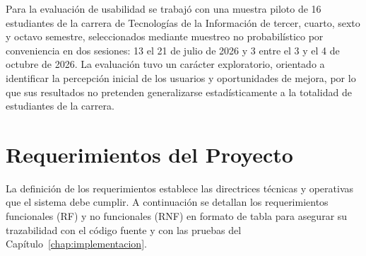 Para la evaluación de usabilidad se trabajó con una muestra piloto de 16 estudiantes de la carrera de Tecnologías de la Información de tercer, cuarto, sexto y octavo semestre, seleccionados mediante muestreo no probabilístico por conveniencia en dos sesiones: 13 el 21 de julio de 2026 y 3 entre el 3 y el 4 de octubre de 2026. La evaluación tuvo un carácter exploratorio, orientado a identificar la percepción inicial de los usuarios y oportunidades de mejora, por lo que sus resultados no pretenden generalizarse estadísticamente a la totalidad de estudiantes de la carrera.

\section{Requerimientos del Proyecto}
\label{sec:requerimientos}

La definición de los requerimientos establece las directrices técnicas y operativas que el sistema debe cumplir. A continuación se detallan los requerimientos funcionales (RF) y no funcionales (RNF) en formato de tabla para asegurar su trazabilidad con el código fuente y con las pruebas del Capítulo~\ref{chap:implementacion}.

